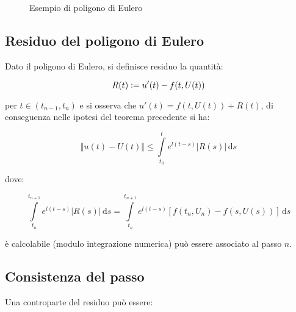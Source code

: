 \documentclass[hidelinks, 10pt]{report}
\begin{document}
\begin{center}
\begin{figure}[H]

\caption{Esempio di poligono di Eulero}
\end{figure}
\end{center}

\subsection{Residuo del poligono di Eulero}
Dato il poligono di Eulero, si definisce residuo la quantit\`a:

\[ R(t) \vcentcolon= u'(t) - f(t, U(t)) \]

per $ t \in (t_{n - 1}, t_{n}) $ e si osserva che $ u'(t) = f(t, U(t)) + R(t) $, di conseguenza nelle ipotesi del teorema precedente si ha:

\[ \Vert u(t) - U(t) \Vert \leq \int\limits_{t_{0}}^{t} e^{l(t - s)} \vert R(s) \vert \, \mathrm{d}s \] 

dove:

\[
\int\limits_{t_{n}}^{t_{n + 1}} e^{l(t - s)} \vert R(s) \vert \, \mathrm{d}s = \int\limits_{t_{n}}^{t_{n + 1}} e^{l(t - s)} [f(t_{n}, U_{n}) - f(s, U(s))] \, \mathrm{d}s
\]

\`e calcolabile (modulo integrazione numerica) pu\`o essere associato al passo $ n $.	%

\subsection{Consistenza del passo}
Una controparte del residuo pu\`o essere:
\end{document}
